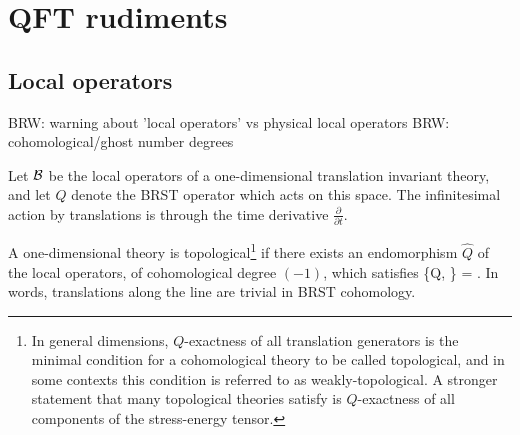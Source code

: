 \documentclass[11pt]{amsart}
\def\brian#1{{\textcolor{blue!65!red}{BRW: {#1}}}}
\begin{document}




%

\section{QFT rudiments}


\subsection{Local operators}

\brian{warning about 'local operators' vs physical local operators}
\brian{cohomological/ghost number degrees}

Let $\mathcal B$ be the local operators of a one-dimensional translation invariant theory, and let $Q$ denote the BRST operator which acts on this space. 
The infinitesimal action by translations is through the time derivative $\frac{\partial}{\partial t}$. 

A one-dimensional theory is topological\footnote{In general dimensions, $Q$-exactness of all translation generators is the minimal condition for a cohomological theory to be called topological, and in some contexts this condition is referred to as weakly-topological. A stronger statement that many topological theories satisfy is $Q$-exactness of all components of the stress-energy tensor.} if there exists an endomorphism $\hat{Q}$ of the local operators, of cohomological degree $(-1)$, which satisfies
\beqn\label{eqn:triv}
\{Q, \} =  .
\eeqn
In words, translations along the line are trivial in BRST cohomology. 
\end{document}
